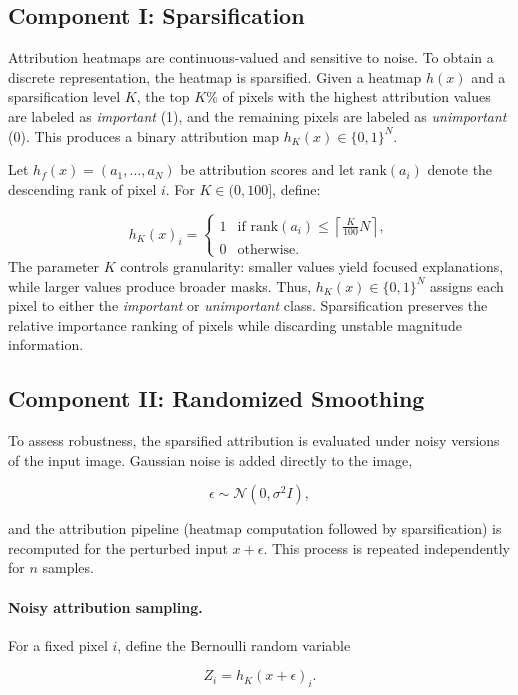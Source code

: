 \documentclass[11pt]{article}
\begin{document}
\subsection{Component I: Sparsification}
Attribution heatmaps are continuous‑valued and sensitive to noise. To obtain a discrete representation, the heatmap is sparsified. Given a heatmap $h(x)$ and a sparsification level $K$, the top $K\%$ of pixels with the highest attribution values are labeled as \emph{important} (1), and the remaining pixels are labeled as \emph{unimportant} (0). This produces a binary attribution map $h_K(x) \in \{0,1\}^N$. 

Let $h_f(x) = (a_1, \dots, a_N)$ be attribution scores and let $\mathrm{rank}(a_i)$ denote the descending rank of pixel $i$. For $K \in (0,100]$, define:

$$
h_K(x)_i =
\begin{cases}
1 & \text{if } \mathrm{rank}(a_i) \le \left\lceil \frac{K}{100} N \right\rceil, \\
0 & \text{otherwise}.
\end{cases}
$$
The parameter $K$ controls granularity: smaller values yield focused explanations, while larger values produce broader masks.
Thus, $h_K(x) \in \{0,1\}^N$ assigns each pixel to either the \emph{important} or \emph{unimportant} class.
Sparsification preserves the relative importance ranking of pixels while discarding unstable magnitude information. 

\subsection{Component II: Randomized Smoothing}

To assess robustness, the sparsified attribution is evaluated under noisy versions of the input image. Gaussian noise is added directly to the image,

$$
\epsilon \sim \mathcal{N}(0, \sigma^2 I),
$$

and the attribution pipeline (heatmap computation followed by sparsification) is recomputed for the perturbed input $x+\epsilon$. This process is repeated independently for $n$ samples.

\paragraph{Noisy attribution sampling.}
For a fixed pixel $i$, define the Bernoulli random variable

$$
Z_i = h_K(x+\epsilon)_i.
$$
\end{document}
